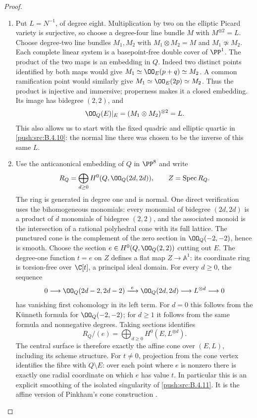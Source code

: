 \begin{proof}
\begin{enumerate}[label=\arabic*.,leftmargin=*]
\item Put $L=N^{-1}$, of degree eight.  Multiplication by two on the
elliptic Picard variety is surjective, so choose a degree-four
line bundle $M$ with $M^{\otimes2}=L$.
Choose degree-two line bundles $M_1,M_2$ with
$M_1\otimes M_2=M$ and $M_1\not\simeq M_2$.
Each complete linear system is a basepoint-free double cover of
$\PP^1$.  The product of the two maps is an embedding in $Q$.
Indeed two distinct points identified by both maps would give
$M_1\simeq\OO_E(p+q)\simeq M_2$.
A common ramification point would similarly give
$M_1\simeq\OO_E(2p)\simeq M_2$.
Thus the product is injective and immersive; properness makes it a
closed embedding.  Its image has bidegree $(2,2)$, and
\[
 \OO_Q(E)|_E=(M_1\otimes M_2)^{\otimes2}=L.
\]
This also allows us to start with the fixed quadric and elliptic
quartic in \ref{push:src:B.4.10}: the normal line there was chosen to be the
inverse of this same $L$.

\item Use the anticanonical embedding of $Q$ in $\PP^8$ and write
\[
 R_Q=\bigoplus_{d\ge0}H^0(Q,\OO_Q(2d,2d)),\qquad
 Z=\operatorname{Spec}R_Q.
\]
The ring is generated in degree one and is normal.
One direct verification uses the bihomogeneous monomials:
every monomial of bidegree $(2d,2d)$ is a product of $d$
monomials of bidegree $(2,2)$, and the associated monoid is the
intersection of a rational polyhedral cone with its full lattice.
The punctured cone is the complement of the zero section in
$\OO_Q(-2,-2)$, hence is smooth.
Choose the section $e\in H^0(Q,\OO_Q(2,2))$ cutting out $E$.
The degree-one function $t=e$ on $Z$ defines a flat map
$Z\to\mathbb A^1$: its coordinate ring is torsion-free over
$\C[t]$, a principal ideal domain.
For every $d\ge0$, the sequence
\[
 0\longrightarrow\OO_Q(2d-2,2d-2)
 \xrightarrow{\ e\ }\OO_Q(2d,2d)
 \longrightarrow L^{\otimes d}\longrightarrow0
\]
has vanishing first cohomology in its left term.
For $d=0$ this follows from the K\"unneth formula for
$\OO_Q(-2,-2)$; for $d\ge1$ it follows from the same formula
and nonnegative degrees.
Taking sections identifies
\[
 R_Q/(e)=\bigoplus_{d\ge0}H^0(E,L^{\otimes d}).
\]
The central surface is therefore exactly the affine cone over
$(E,L)$, including its scheme structure.
For $t\ne0$, projection from the cone vertex identifies the
fibre with $Q\setminus E$: over each point where $e$ is nonzero
there is exactly one radial coordinate on which $e$ has value $t$.
In particular this is an explicit smoothing of the isolated
singularity of \ref{push:src:B.4.11}.
It is the affine version of Pinkham's cone construction
\citep[Remark~7.6(iii), p.~46; Section~9, pp.~63--65]{Pinkham1974Root}.


\end{enumerate}
\end{proof}
